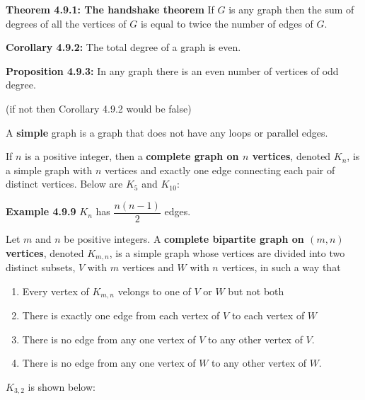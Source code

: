 \documentclass[11pt]{article}
\begin{document}
\bigskip
{\bf Theorem 4.9.1: The handshake theorem} If $G$ is any graph then the sum of 
degrees of all the vertices of $G$ is equal to twice the number of edges of $G$. 

\bigskip
{\bf Corollary 4.9.2:} The total degree of a graph is even. 

\bigskip
{\bf Proposition 4.9.3:} In any graph there is an even number of vertices of 
odd degree. 

(if not then Corollary 4.9.2 would be false)

\bigskip
A {\bf simple} graph is a graph that does not have any loops or parallel edges. 

\bigskip
If $n$ is a positive integer, then a {\bf complete graph on $n$ vertices}, 
denoted $K_n$, is a simple graph with $n$ vertices and exactly one edge 
connecting each pair of distinct vertices. Below are $K_5$ and $K_{10}$:

\begin{center}
\end{center}


\begin{center}
\end{center}

{\bf Example 4.9.9} $K_n$ has $\dfrac{n(n-1)}{2}$ edges. 

\bigskip
Let $m$ and $n$ be positive integers. A {\bf complete bipartite graph on $(m,n)$ 
vertices}, denoted $K_{m, n}$, is a simple graph whose vertices are divided 
into two distinct subsets, $V$ with $m$ vertices and $W$ with $n$ vertices, 
in such a way that 
\begin{enumerate}
    \item Every vertex of $K_{m,n}$ velongs to one of $V$ or $W$ but not both
    \item There is exactly one edge from each vertex of $V$ to each vertex of $W$
    \item There is no edge from any one vertex of $V$ to any other vertex of $V$. 
    \item There is no edge from any one vertex of $W$ to any other vertex of $W$. 
\end{enumerate}

$K_{3, 2}$ is shown below:

\begin{center}
\end{center}
\end{document}
